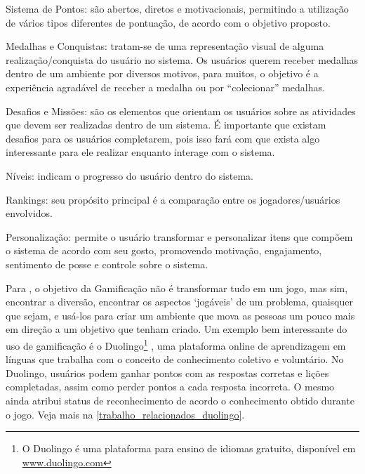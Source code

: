 \begin{alineascomponto}
	\item Sistema de Pontos: são abertos, diretos e motivacionais, permitindo a utilização de vários tipos diferentes de pontuação, de acordo com o objetivo proposto.
	\item Medalhas e Conquistas: tratam-se de uma representação visual de alguma realização/conquista do usuário no sistema. Os usuários querem receber medalhas dentro de um ambiente por diversos 
 motivos, para muitos, o objetivo é a experiência agradável de receber a medalha ou por “colecionar” medalhas.
	\item Desafios e Missões: são os elementos que orientam os usuários sobre as atividades que devem ser realizadas dentro de um sistema. É importante que existam desafios 
para os usuários completarem, pois isso fará com que exista algo interessante para ele realizar enquanto interage com o sistema.
	\item N\'iveis: indicam o progresso do usuário dentro do sistema. 
	\item Rankings: seu propósito principal é a comparação entre os jogadores/usuários envolvidos.
	\item Personalização: permite o usuário transformar e personalizar itens que compõem o sistema de acordo com seu gosto, promovendo motivação, engajamento, sentimento de posse e controle sobre 
o sistema. 
\end{alineascomponto}

Para , o objetivo da Gamificação não é transformar tudo em um jogo, mas sim, encontrar a diversão, encontrar os aspectos `jogáveis' de um problema, quaisquer que 
sejam, e usá-los para criar um ambiente que mova as pessoas um pouco mais em direção a um objetivo que tenham criado. Um exemplo bem interessante do uso de gamificação é o Duolingo\footnote{O 
Duolingo é uma plataforma para ensino de idiomas gratuito, dispon\'ivel em \url{www.duolingo.com} } \cite{von2013duolingo}, uma plataforma online de aprendizagem em línguas que trabalha com o 
conceito de conhecimento coletivo e voluntário. No Duolingo, usuários podem ganhar pontos com as respostas corretas e lições completadas, assim como perder pontos a cada resposta incorreta. O mesmo 
ainda atribui status de reconhecimento de acordo o conhecimento obtido durante o jogo. Veja mais na 
\autoref{trabalho_relacionados_duolingo}.

